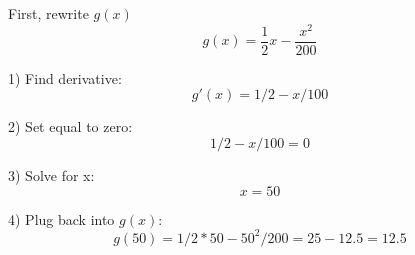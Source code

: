 \documentclass{article}
\begin{document}
First, rewrite $g(x)$
$$g(x) = \frac{1}{2}x - \frac{x^2}{200}$$

1) Find derivative: 
$$g'(x) = 1/2 - x/100$$

2) Set equal to zero:
$$1/2 -x/100 = 0$$

3) Solve for x: 
$$x = 50$$

4) Plug back into $g(x)$:
$$g(50) = 1/2*50 - 50^2/200 = 25 - 12.5 = 12.5$$\\





    
\end{document}
